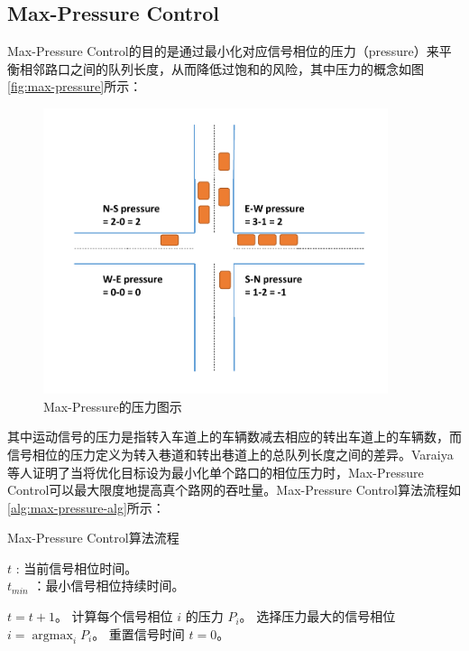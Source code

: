 \subsection{Max-Pressure Control}
Max-Pressure Control的目的是通过最小化对应信号相位的压力（pressure）来平衡相邻路口之间的队列长度，从而降低过饱和的风险，其中压力的概念如图\autoref{fig:max-pressure}所示：
\begin{figure}[htb]
    \includegraphics[width=0.9\textwidth]{fig/max-pressure.pdf}
    \caption{Max-Pressure的压力图示}
    \label{fig:max-pressure}
\end{figure}
其中运动信号的压力是指转入车道上的车辆数减去相应的转出车道上的车辆数，而信号相位的压力定义为转入巷道和转出巷道上的总队列长度之间的差异。Varaiya\cite{varaiya2013max}等人证明了当将优化目标设为最小化单个路口的相位压力时，Max-Pressure Control可以最大限度地提高真个路网的吞吐量。Max-Pressure Control算法流程如\autoref{alg:max-pressure-alg}所示：
\begin{breakablealgorithm}
    \caption{Max-Pressure Control算法流程}
    \label{alg:max-pressure-alg}
    \begin{algorithmic}[1] %
        \Require 
        $t$ : 当前信号相位时间。\\
        $t_{min}$ ：最小信号相位持续时间。 

        \State $t = t+1$。
        \State 计算每个信号相位 $i$ 的压力 $P_i$。
        \State 选择压力最大的信号相位 $i=\mathop{\arg\max}_i{P_i}$。
        \State 重置信号时间 $t=0$。
        \EndIf
        \EndFor
    \end{algorithmic}  
\end{breakablealgorithm}  

